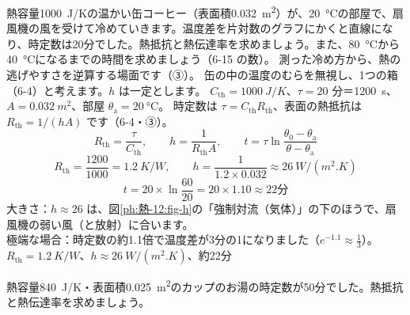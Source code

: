 \label{ph:熱-12:ex2}
\begin{phreidai}[冷める缶コーヒーの熱伝達率]
熱容量\qty{1000}{J/K}の温かい缶コーヒー（表面積\qty{0.032}{m^2}）が、\qty{20}{\celsius}の部屋で、扇風機の風を受けて冷めていきます。温度差を片対数のグラフにかくと直線になり、時定数は20分でした。熱抵抗と熱伝達率を求めましょう。また、\qty{80}{\celsius}から\qty{40}{\celsius}になるまでの時間を求めましょう（6-15 の数）。
\phbamen
測った冷め方から、熱の逃げやすさを逆算する場面です（③）。
\phmushi
缶の中の温度のむらを無視し、1つの箱（6-4）と考えます。$h$ は一定とします。
\phzu
$C_{\mathrm{th}}=\qty{1000}{J/K}$、$\tau=20$ 分＝\qty{1200}{s}、$A=\qty{0.032}{m^2}$、部屋 $\theta_{\mathrm a}=\qty{20}{\celsius}$。
\phriyu
時定数は $\tau=C_{\mathrm{th}}R_{\mathrm{th}}$、表面の熱抵抗は $R_{\mathrm{th}}=1/(hA)$ です（6-4・③）。
\phtateru
\[R_{\mathrm{th}}=\frac{\tau}{C_{\mathrm{th}}},\qquad h=\frac{1}{R_{\mathrm{th}}A},\qquad t=\tau\ln\frac{\theta_0-\theta_{\mathrm a}}{\theta-\theta_{\mathrm a}}\]
\phtoku
\[R_{\mathrm{th}}=\frac{1200}{1000}=\qty{1.2}{K/W},\qquad h=\frac{1}{1.2\times0.032}\approx\qty{26}{W/(m^2.K)}\]
\[t=20\times\ln\frac{60}{20}=20\times1.10\approx22\text{分}\]
\phtashikame
大きさ：$h\approx26$ は、図\ref{ph:熱-12:fig-h}の「強制対流（気体）」の下のほうで、扇風機の弱い風（と放射）に合います。\\
極端な場合：時定数の約1.1倍で温度差が3分の1になりました（$e^{-1.1}\approx\tfrac13$）。
\kotae $R_{\mathrm{th}}=\qty{1.2}{K/W}$、$h\approx\qty{26}{W/(m^2.K)}$、約22分
\end{phreidai}
\begin{jibun}
熱容量\qty{840}{J/K}・表面積\qty{0.025}{m^2}のカップのお湯の時定数が50分でした。熱抵抗と熱伝達率を求めましょう。
\end{jibun}

